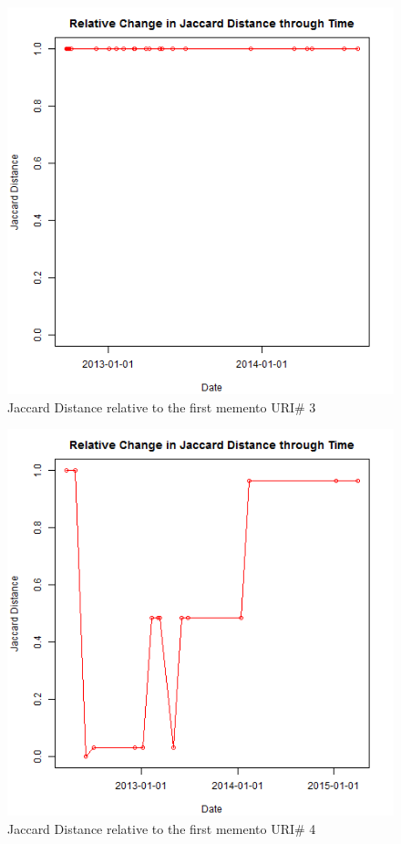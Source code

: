 \begin{figure}[ht]
	\begin{center}
		 \includegraphics[scale=0.60]{url3}
		  \caption{Jaccard Distance relative to the first memento URI\# 3}
	 \end{center}
\end{figure}
\begin{figure}[ht]
	\begin{center}
		 \includegraphics[scale=0.60]{url4}
		  \caption{Jaccard Distance relative to the first memento URI\# 4}
	 \end{center}
\end{figure}
